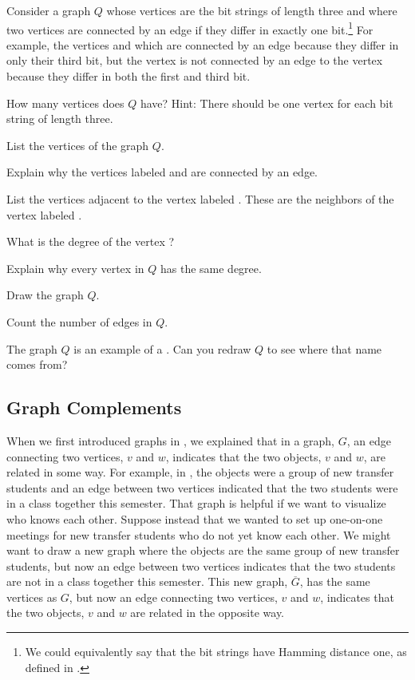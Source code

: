 \begin{act}
\label{act_cube_graph} 
    Consider a graph $Q$ whose vertices are the bit strings of length three and where two vertices are connected by an edge if they differ in exactly one bit.\footnote{We could equivalently say that the bit strings have Hamming distance one, as defined in  .}  For example, the vertices  and  which are connected by an edge because they differ in only their third bit, but the vertex  is not connected by an edge to the vertex  because they differ in both the first and third bit.
    \begin{actpart}       
        \item How many vertices does $Q$ have?  Hint: There should be one vertex for each bit string of length three.
        \item List the vertices of the graph $Q$.
        \item Explain why the vertices labeled  and  are connected by an edge.
        \item List the vertices adjacent to the vertex labeled .  These are the neighbors of the vertex labeled .
        \item What is the degree of the vertex ?
        \item Explain why every vertex in $Q$ has the same degree.
        \item Draw the graph $Q$.       
        \item Count the number of edges in $Q$.
        \item The graph $Q$ is an example of a .  Can you redraw $Q$ to see where that name comes from?
    \end{actpart}
\end{act}


\newcommand{\subgraphcomp}{Graph Complements}
\subsection{\subgraphcomp}
\label{sub_graph_complement}

When we first introduced graphs in , we explained that in a graph, $G$, an edge connecting two vertices, $v$ and $w$, indicates that the two objects, $v$ and $w$, are related in some way.  For example, in , the objects were a group of new transfer students and an edge between two vertices indicated that the two students were in a class together this semester.  That graph is helpful if we want to visualize who knows each other.  Suppose instead that we wanted to set up one-on-one meetings for new transfer students who do not yet know each other.  We might want to draw a new graph where the objects are the same group of new transfer students, but now an edge between two vertices indicates that the two students are not in a class together this semester.  This new graph, $\overline{G}$, has the same vertices as $G$, but now an edge connecting two vertices, $v$ and $w$, indicates that the two objects, $v$ and $w$ are related in the opposite way.

